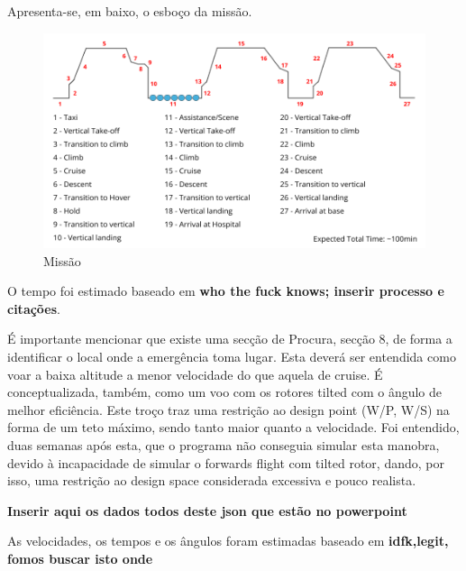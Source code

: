 Apresenta-se, em baixo, o esboço da missão.
\FloatBarrier
\begin{figure}[h]
    \centering
    \includegraphics[width=\textwidth]{Imagens/PI - Semana 3.png}
    \caption{Missão}
    \label{fig:my_label}
\end{figure}
\FloatBarrier
O tempo foi estimado baseado em \textbf{who the fuck knows; inserir processo e citações}.\par
É importante mencionar que existe uma secção de Procura, secção 8, de forma a identificar o local onde a emergência toma lugar. Esta deverá ser entendida como voar a baixa altitude a menor velocidade do que aquela de cruise. É conceptualizada, também, como um voo com os rotores tilted com o ângulo de melhor eficiência. Este troço traz uma restrição ao design point (W/P, W/S) na forma de um teto máximo, sendo tanto maior quanto a velocidade. Foi entendido, duas semanas após esta, que o programa não conseguia simular esta manobra, devido à incapacidade de simular o forwards flight com tilted rotor, dando, por isso, uma restrição ao design space considerada excessiva e pouco realista.\par
{\Large{\textbf{Inserir aqui os dados todos deste json que estão no powerpoint}}}\par
As velocidades, os tempos e os ângulos foram estimadas baseado em {\large{\textbf{idfk,legit, fomos buscar isto onde}}}\par
